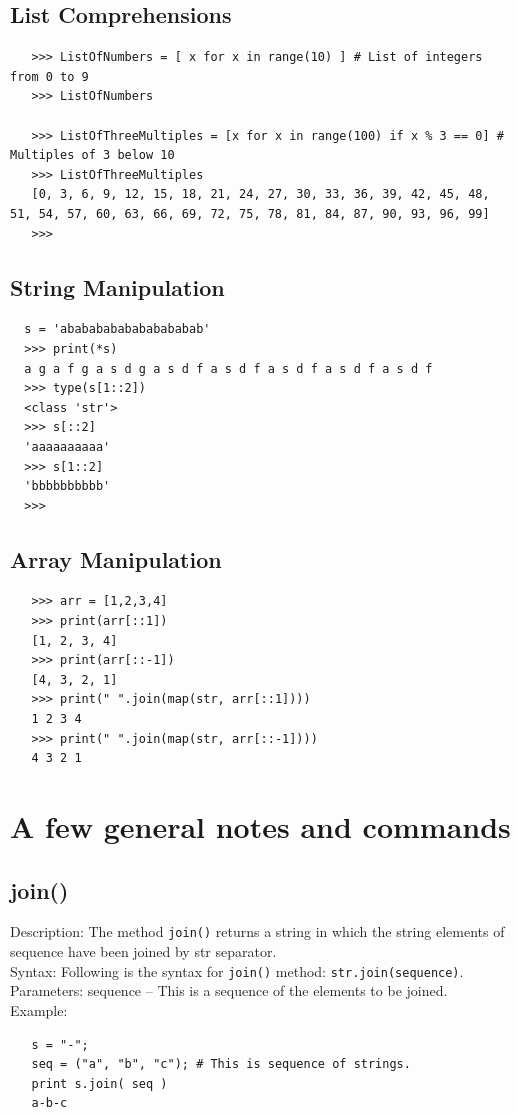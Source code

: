 \documentclass[11pt,a4paper]{article}
\begin{document}
    \subsection{List Comprehensions}
    \begin{lstlisting}
   >>> ListOfNumbers = [ x for x in range(10) ] # List of integers from 0 to 9
   >>> ListOfNumbers

   >>> ListOfThreeMultiples = [x for x in range(100) if x % 3 == 0] # Multiples of 3 below 10
   >>> ListOfThreeMultiples
   [0, 3, 6, 9, 12, 15, 18, 21, 24, 27, 30, 33, 36, 39, 42, 45, 48, 51, 54, 57, 60, 63, 66, 69, 72, 75, 78, 81, 84, 87, 90, 93, 96, 99]
   >>> 
  \end{lstlisting}  


    \subsection{String Manipulation}
    \begin{lstlisting}
  s = 'abababababababababab'
  >>> print(*s)
  a g a f g a s d g a s d f a s d f a s d f a s d f a s d f
  >>> type(s[1::2])
  <class 'str'>
  >>> s[::2]
  'aaaaaaaaaa'
  >>> s[1::2]
  'bbbbbbbbbb'
  >>> 
  \end{lstlisting}  

    \subsection{Array Manipulation}
    \begin{lstlisting}
   >>> arr = [1,2,3,4]
   >>> print(arr[::1])
   [1, 2, 3, 4]
   >>> print(arr[::-1])
   [4, 3, 2, 1]
   >>> print(" ".join(map(str, arr[::1])))
   1 2 3 4
   >>> print(" ".join(map(str, arr[::-1])))
   4 3 2 1
  \end{lstlisting}  



 \newpage
\section{A few general notes and commands}
    \subsection{join()}
    Description: The method {\tt join()} returns a string in which the string elements of sequence have been joined by str separator.\\
    Syntax: Following is the syntax for {\tt join()} method: {\tt str.join(sequence)}. \\
    Parameters: sequence -- This is a sequence of the elements to be joined. \\
    Example: 
    \begin{lstlisting}
   s = "-";
   seq = ("a", "b", "c"); # This is sequence of strings.
   print s.join( seq )
   a-b-c
  \end{lstlisting}
\end{document}
